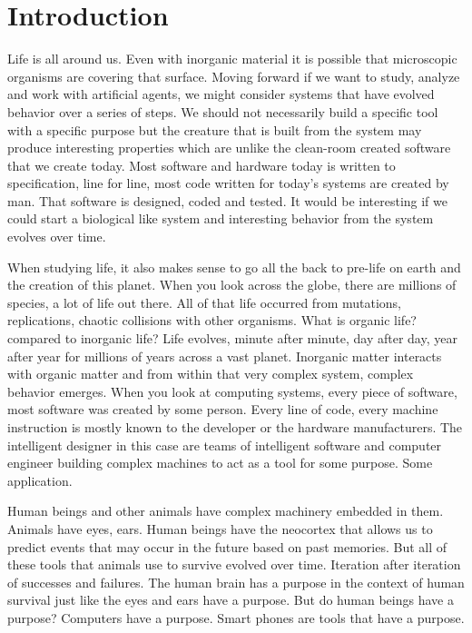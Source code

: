 
\section{Introduction}

Life is all around us.  Even with inorganic material it is possible that
microscopic organisms are covering that surface.  Moving forward if we want to
study, analyze and work with artificial agents, we might consider systems that have evolved behavior over a series of steps.  We
should not necessarily build a specific tool with a specific purpose but the
creature that is built from the system may produce interesting properties which
are unlike the clean-room created software that we create today.  Most software
and hardware today is written to specification, line for line, most code written
for today's systems are created by man.  That software is designed, coded and
tested.  It would be interesting if we could start a biological like system and
interesting behavior from the system evolves over time.     

When studying life, it also makes sense to go all the back to pre-life on earth
and the creation of this planet.  When you look across the globe, there are millions of species, a
lot of life out there.  All of that life occurred from mutations, replications, chaotic collisions with other organisms. What is organic life? compared to inorganic
life?  Life evolves, minute after minute, day after day, year after year for
millions of years across a vast planet.  Inorganic matter interacts with organic matter and from within that very complex system, complex behavior emerges.  When you
look at computing systems, every piece of software, most software was created by some person.  Every line of code, every machine instruction is mostly
known to the developer or the hardware manufacturers.  The intelligent designer
in this case are teams of intelligent software and computer engineer building
complex machines to act as a tool for some purpose.  Some application.

Human beings and other animals have complex machinery embedded in them.  Animals
have eyes, ears. Human beings have the neocortex that allows us to predict
events that may occur in the future based on past memories.  But all of these
tools that animals use to survive evolved over time.  Iteration after iteration
of successes and failures.  The human brain has a purpose in the context of
human survival just like the eyes and ears have a purpose.  But do human beings
have a purpose?  Computers have a purpose.  Smart phones are tools that have a
purpose.

